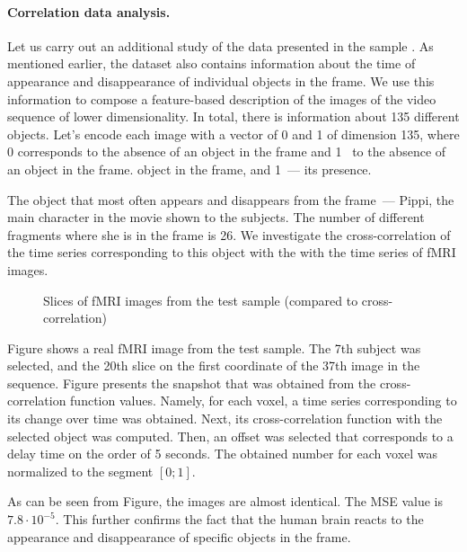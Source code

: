 \documentclass{article}
\begin{document}
\paragraph*{Correlation data analysis.}

Let us carry out an additional study of the data presented in the sample \citep{Berezutskaya2022}.
As mentioned earlier, the dataset also contains information about the time of appearance
and disappearance of individual objects in the frame. We use this information to compose a feature-based
description of the images of the video sequence of lower dimensionality. In total, there is information about 135 different objects.
Let's encode each image with a vector of 0 and 1 of dimension 135, where 0 corresponds to the absence of an object in the frame and 1~ to the absence of an object in the frame.
object in the frame, and 1~--- its presence.

The object that most often appears and disappears from the frame~--- Pippi, the main character in the movie shown to the subjects. 
The number of different fragments where she is in the frame is 26. We investigate the cross-correlation of the time series corresponding to this object with the 
with the time series of fMRI images.

\begin{figure}[h!]
	\centering
	\hfill
	\hfill
	\caption{Slices of fMRI images from the test sample (compared to cross-correlation)}
	\label{fig:occur}
\end{figure}

Figure shows a real fMRI image from the test sample. 
The 7th subject was selected, and the 20th slice on the first coordinate of the 37th image in the sequence.
Figure presents the snapshot that was obtained from the cross-correlation function values.
Namely, for each voxel, a time series corresponding to its change over time was obtained.
Next, its cross-correlation function with the selected object was computed.
Then, an offset was selected that corresponds to a delay time on the order of 5 seconds.
The obtained number for each voxel was normalized to the segment $[0; 1]$.

As can be seen from Figure, the images are almost identical. 
The MSE value is $7.8 \cdot 10^{-5}$. This further confirms the fact that the human brain reacts 
to the appearance and disappearance of specific objects in the frame.
\end{document}
